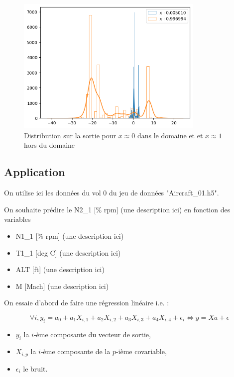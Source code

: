 \documentclass[french,12pt]{article}
\begin{document}
\begin{figure}[H]
    \centering
    \includegraphics[width = 0.8\textwidth]{../plots/outputUQSin.png}
    \caption{Distribution sur la sortie pour $x \approx 0$ dans le domaine et et $x \approx 1$ hors du domaine}
\end{figure}

\subsection{Application}

On utilise ici les données du vol 0 du jeu de données "Aircraft\_01.h5".

On souhaite prédire le N2\_1 [\% rpm] (une description ici) en fonction des variables

\begin{itemize}
    \item N1\_1 [\% rpm] (une description ici)
    \item T1\_1 [deg C] (une description ici)
    \item ALT [ft] (une description ici)
    \item M [Mach] (une description ici)
\end{itemize}

On essaie d'abord de faire une régression linéaire i.e. :

$$\forall i, y_i = a_0 + a_1 X_{i, 1}+ a_2 X_{i, 2}+ a_3 X_{i, 3}+ a_4 X_{i, 4} + \epsilon_i \Leftrightarrow y = X a + \epsilon$$

\begin{itemize}
    \item $y_i$ la $i$-ème composante du vecteur de sortie,
    \item $X_{i,p}$ la $i$-ème composante de la $p$-ième covariable,
    \item $\epsilon_i$ le bruit.
\end{itemize}
\end{document}

